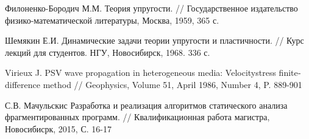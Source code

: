 \begin{thebibliography}{00}
	Филоненко-Бородич М.М.
	Теория упругости. //
	Государственное издательство физико-математической литературы, Москва, 1959, 365 с.

	Шемякин Е.И.
	Динамические задачи теории упругости и пластичности. //
	Курс лекций для студентов. НГУ, Новосибирск, 1968. 336 с.

	Virieux J.
	P­SV wave propagation in heterogeneous media: Velocity­stress finite­difference method //
	Geophysics, Volume 51, April 1986, Number 4, P. 889­-901

	С.В. Мачульскис
	Разработка и реализация алгоритмов статического анализа фрагментированных программ. //
	Квалификационная работа магистра, Новосибисрк, 2015, С. 16-17

\end{thebibliography}
\endgroup

\clearpage